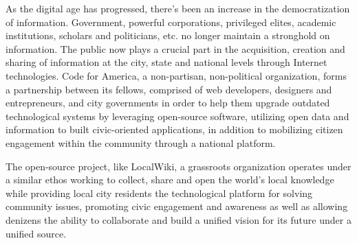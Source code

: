 
As the digital age has progressed, there's been an increase in the democratization of information. Government, powerful corporations, privileged elites, academic institutions, scholars and politicians, etc. no longer
maintain a stronghold on information. The public now plays a crucial part in the acquisition, creation and sharing of information at the city, state and 
national levels through Internet technologies. Code for America, a non-partisan, non-political organization, forms a partnership between its fellows, comprised of web developers, designers and entrepreneurs, and city governments in order to help them upgrade outdated technological systems by leveraging open-source software, utilizing open data and information to built civic-oriented applications, in addition to mobilizing citizen engagement within the community through a national platform. 

The open-source project, like LocalWiki, a grassroots organization operates under a similar ethos working to collect, share and open the world’s local knowledge while providing local city residents the technological platform for solving community issues, promoting civic engagement and awareness as well as allowing denizens the ability to collaborate and build a unified vision for its future under a unified source. 